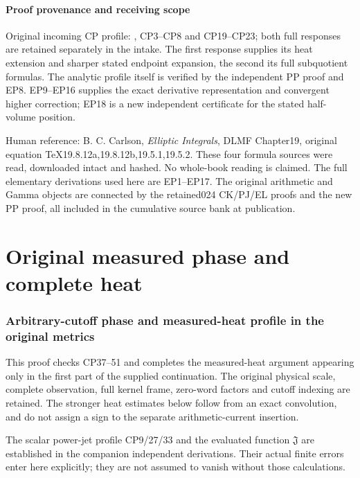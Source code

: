 \documentclass[10pt]{article}
\begin{document}
\subsection{Proof provenance and receiving scope}\label{proof-provenance-and-receiving-scope}

Original incoming CP profile: , CP3--CP8 and CP19--CP23; both full responses are retained separately in the intake. The first response supplies its heat extension and sharper stated endpoint expansion, the second its full subquotient formulas. The analytic profile itself is verified by the independent PP proof and EP8. EP9--EP16 supplies the exact derivative representation and convergent higher correction; EP18 is a new independent certificate for the stated half-volume position.

Human reference: B. C. Carlson, \emph{Elliptic Integrals}, DLMF Chapter19, original equation TeX19.8.12a,19.8.12b,19.5.1,19.5.2. These four formula sources were read, downloaded intact and hashed. No whole-book reading is claimed. The full elementary derivations used here are EP1--EP17. The original arithmetic and Gamma objects are connected by the retained024 CK/PJ/EL proofs and the new PP proof, all included in the cumulative source bank at publication.

\clearpage\part{Original measured phase and complete heat}
\section{Arbitrary-cutoff phase and measured-heat profile in the original metrics}\label{arbitrary-cutoff-phase-and-measured-heat-profile-in-the-original-metrics}

This proof checks CP37--51 and completes the measured-heat argument appearing only in the first part of the supplied continuation. The original physical scale, complete observation, full kernel frame, zero-word factors and cutoff indexing are retained. The stronger heat estimates below follow from an exact convolution, and do not assign a sign to the separate arithmetic-current insertion.

The scalar power-jet profile CP9/27/33 and the evaluated function \(\mathfrak J\) are established in the companion independent derivations. Their actual finite errors enter here explicitly; they are not assumed to vanish without those calculations.
\end{document}
